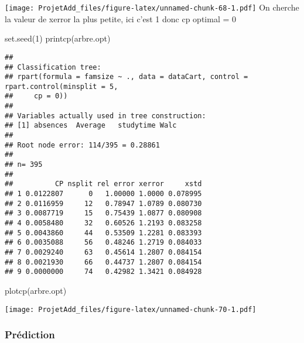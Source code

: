\documentclass[
]{article}
\newenvironment{Shaded}{\begin{snugshade}}{\end{snugshade}}
\newcommand{\DecValTok}[1]{\textcolor[rgb]{0.00,0.00,0.81}{#1}}
\newcommand{\FunctionTok}[1]{\textcolor[rgb]{0.00,0.00,0.00}{#1}}
\newcommand{\NormalTok}[1]{#1}
\begin{document}
\texttt{[image: ProjetAdd\_files/figure-latex/unnamed-chunk-68-1.pdf]} On
cherche la valeur de xerror la plus petite, ici c'est 1 donc cp optimal
= 0

\begin{Shaded}
\begin{Highlighting}[]
\FunctionTok{set.seed}\NormalTok{(}\DecValTok{1}\NormalTok{)}
\FunctionTok{printcp}\NormalTok{(arbre.opt)}
\end{Highlighting}
\end{Shaded}

\begin{verbatim}
## 
## Classification tree:
## rpart(formula = famsize ~ ., data = dataCart, control = rpart.control(minsplit = 5, 
##     cp = 0))
## 
## Variables actually used in tree construction:
## [1] absences  Average   studytime Walc     
## 
## Root node error: 114/395 = 0.28861
## 
## n= 395 
## 
##          CP nsplit rel error xerror     xstd
## 1 0.0122807      0   1.00000 1.0000 0.078995
## 2 0.0116959     12   0.78947 1.0789 0.080730
## 3 0.0087719     15   0.75439 1.0877 0.080908
## 4 0.0058480     32   0.60526 1.2193 0.083258
## 5 0.0043860     44   0.53509 1.2281 0.083393
## 6 0.0035088     56   0.48246 1.2719 0.084033
## 7 0.0029240     63   0.45614 1.2807 0.084154
## 8 0.0021930     66   0.44737 1.2807 0.084154
## 9 0.0000000     74   0.42982 1.3421 0.084928
\end{verbatim}

\begin{Shaded}
\begin{Highlighting}[]
\FunctionTok{plotcp}\NormalTok{(arbre.opt)}
\end{Highlighting}
\end{Shaded}

\texttt{[image: ProjetAdd\_files/figure-latex/unnamed-chunk-70-1.pdf]}

\hypertarget{pruxe9diction}{%
\subsubsection{Prédiction}\label{pruxe9diction}}
\end{document}
